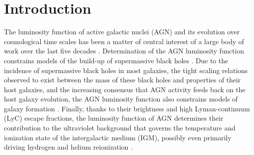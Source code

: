 \documentclass[fleqn,usenatbib]{mnras}
\begin{document}
\section{Introduction}

The luminosity function of active galactic nuclei (AGN) and its
evolution over cosmological time scales has been a matter of central
interest of a large body of work over the last five decades
\citep{1968ApJ...151..393S, 1978A&A....68...17M, 1983ApJ...269..352S,
  1988ApJ...325...92K, 1988MNRAS.235..935B, 1993ApJ...406L..43H,
  1994ApJ...421..412W, 1995AJ....110...68S, 1995AJ....110.2553K,
  1995ApJ...438..623P, 2000MNRAS.317.1014B, 2001AJ....121...54F,
  2004AJ....128..515F, 2006AJ....131.2766R, 2007ApJ...654..731H,
  2009MNRAS.392...19C, 2010AJ....139..906W, 2011ApJ...728L..26G,
  2013ApJ...773...14R, 2013ApJ...768..105M, 2015AA...578A..83G,
  2015ApJ...798...28K, 2016ApJ...829...33Y, 2016ApJ...833..222J}.
Determination of the AGN luminosity function constrains models of the
build-up of supermassive black holes \citep{1982MNRAS.200..115S,
  2004ApJ...602..603Y, 2007ApJ...654..731H, 2008ApJ...679..118S,
  2009A&A...493...55E, 2000ApJ...531...42H, 2010MNRAS.401.2531A,
  2013ApJ...773...14R, 2014ApJ...787...73D, 2015MNRAS.448.3603D,
  2015MNRAS.452..575S, 2016MNRAS.462..190R}.  Due to the incidence of
supermassive black holes in most galaxies, the tight scaling relations
observed to exist between the mass of these black holes and properties
of their host galaxies, and the increasing consensus that AGN activity
feeds back on the host galaxy evolution, the AGN luminosity function
also constrains models of galaxy formation \citep{2006ApJ...650...42L,
  2008MNRAS.385.1846M}.  Finally, thanks to their brightness and high
Lyman-continuum (LyC) escape fractions, the luminosity function of AGN
determines their contribution to the ultraviolet background that
governs the temperature and ionization state of the intergalactic
medium (IGM), possibly even primarily driving hydrogen and helium
reionization 
\citep{2012ApJ...746..125H, 2015AA...578A..83G, 2017ApJ...847L..15O,
  2018MNRAS.474.2904P, 2018arXiv180104931P}.
\end{document}
